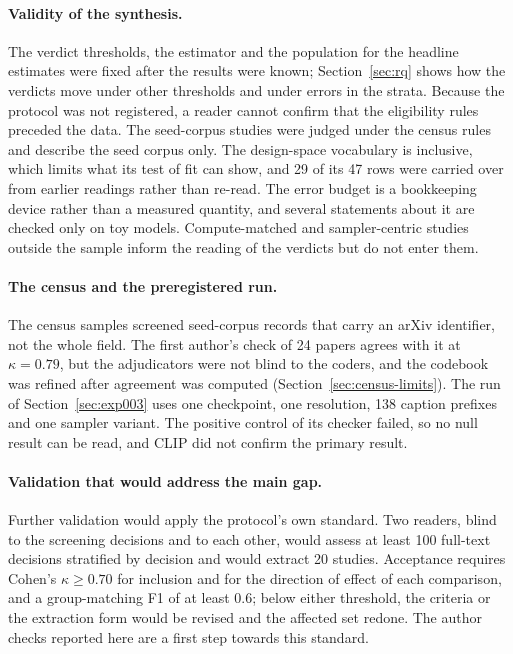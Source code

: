 \paragraph{Validity of the synthesis.}
The verdict thresholds, the estimator and the population for the headline estimates were fixed after the results were known; Section~\ref{sec:rq} shows how the verdicts move under other thresholds and under errors in the strata. Because the protocol was not registered, a reader cannot confirm that the eligibility rules preceded the data. The seed-corpus studies were judged under the census rules and describe the seed corpus only. The design-space vocabulary is inclusive, which limits what its test of fit can show, and 29 of its 47 rows were carried over from earlier readings rather than re-read. The error budget is a bookkeeping device rather than a measured quantity, and several statements about it are checked only on toy models. Compute-matched and sampler-centric studies outside the sample inform the reading of the verdicts but do not enter them.

\paragraph{The census and the preregistered run.}
The census samples screened seed-corpus records that carry an arXiv identifier, not the whole field. The first author's check of 24 papers agrees with it at $\kappa=0.79$, but the adjudicators were not blind to the coders, and the codebook was refined after agreement was computed (Section~\ref{sec:census-limits}). The run of Section~\ref{sec:exp003} uses one checkpoint, one resolution, 138 caption prefixes and one sampler variant. The positive control of its checker failed, so no null result can be read, and CLIP did not confirm the primary result.

\paragraph{Validation that would address the main gap.}
Further validation would apply the protocol's own standard. Two readers, blind to the screening decisions and to each other, would assess at least 100 full-text decisions stratified by decision and would extract 20 studies. Acceptance requires Cohen's $\kappa\ge0.70$ for inclusion and for the direction of effect of each comparison, and a group-matching F1 of at least 0.6; below either threshold, the criteria or the extraction form would be revised and the affected set redone. The author checks reported here are a first step towards this standard.
